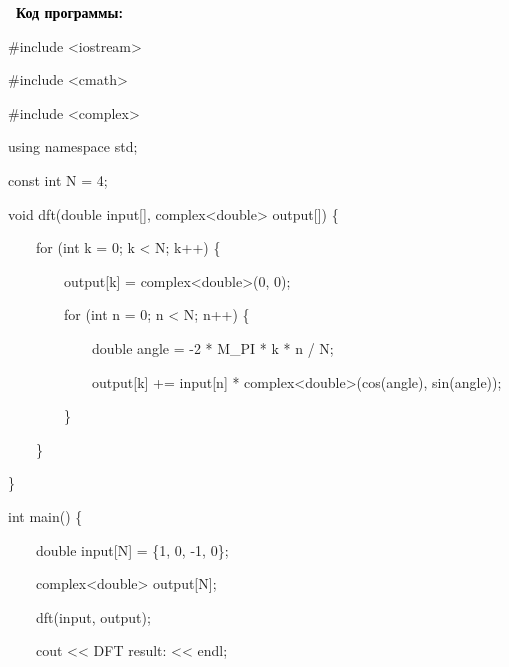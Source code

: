 \documentclass[a4paper]{article}
\begin{document}
\bigskip

{\bfseries
\textcolor{black}{\ Код программы:}}

{\color{black}
\#include {\textless}iostream{\textgreater}}

{\color{black}
\#include {\textless}cmath{\textgreater}}

{\color{black}
\#include {\textless}complex{\textgreater}}


\bigskip

{\color{black}
using namespace std;}


\bigskip

{\color{black}
const int N = 4;}


\bigskip

{\color{black}
void dft(double input[], complex{\textless}double{\textgreater} output[]) \{}

{\color{black}
\ \ \ \ for (int k = 0; k {\textless} N; k++) \{}

{\color{black}
\ \ \ \ \ \ \ \ output[k] = complex{\textless}double{\textgreater}(0, 0);}

{\color{black}
\ \ \ \ \ \ \ \ for (int n = 0; n {\textless} N; n++) \{}

{\color{black}
\ \ \ \ \ \ \ \ \ \ \ \ double angle = -2 * M\_PI * k * n / N;}

{\color{black}
\ \ \ \ \ \ \ \ \ \ \ \ output[k] += input[n] * complex{\textless}double{\textgreater}(cos(angle), sin(angle));}

{\color{black}
\ \ \ \ \ \ \ \ \}}

{\color{black}
\ \ \ \ \}}

{\color{black}
\}}

{\color{black}
int main() \{}

{\color{black}
\ \ \ \ double input[N] = \{1, 0, -1, 0\};}

{\color{black}
\ \ \ \ complex{\textless}double{\textgreater} output[N];}

{\color{black}
\ \ \ \ dft(input, output);}

{\color{black}
\ \ \ \ cout {\textless}{\textless} {\textquotedbl}DFT result:{\textquotedbl} {\textless}{\textless} endl;}
\end{document}
